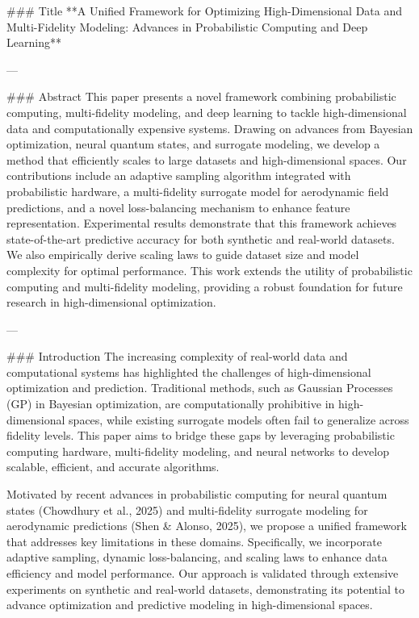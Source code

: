### Title  
**A Unified Framework for Optimizing High-Dimensional Data and Multi-Fidelity Modeling: Advances in Probabilistic Computing and Deep Learning**

---

### Abstract  
This paper presents a novel framework combining probabilistic computing, multi-fidelity modeling, and deep learning to tackle high-dimensional data and computationally expensive systems. Drawing on advances from Bayesian optimization, neural quantum states, and surrogate modeling, we develop a method that efficiently scales to large datasets and high-dimensional spaces. Our contributions include an adaptive sampling algorithm integrated with probabilistic hardware, a multi-fidelity surrogate model for aerodynamic field predictions, and a novel loss-balancing mechanism to enhance feature representation. Experimental results demonstrate that this framework achieves state-of-the-art predictive accuracy for both synthetic and real-world datasets. We also empirically derive scaling laws to guide dataset size and model complexity for optimal performance. This work extends the utility of probabilistic computing and multi-fidelity modeling, providing a robust foundation for future research in high-dimensional optimization.

---

### Introduction  
The increasing complexity of real-world data and computational systems has highlighted the challenges of high-dimensional optimization and prediction. Traditional methods, such as Gaussian Processes (GP) in Bayesian optimization, are computationally prohibitive in high-dimensional spaces, while existing surrogate models often fail to generalize across fidelity levels. This paper aims to bridge these gaps by leveraging probabilistic computing hardware, multi-fidelity modeling, and neural networks to develop scalable, efficient, and accurate algorithms.

Motivated by recent advances in probabilistic computing for neural quantum states (Chowdhury et al., 2025) and multi-fidelity surrogate modeling for aerodynamic predictions (Shen & Alonso, 2025), we propose a unified framework that addresses key limitations in these domains. Specifically, we incorporate adaptive sampling, dynamic loss-balancing, and scaling laws to enhance data efficiency and model performance. Our approach is validated through extensive experiments on synthetic and real-world datasets, demonstrating its potential to advance optimization and predictive modeling in high-dimensional spaces.

